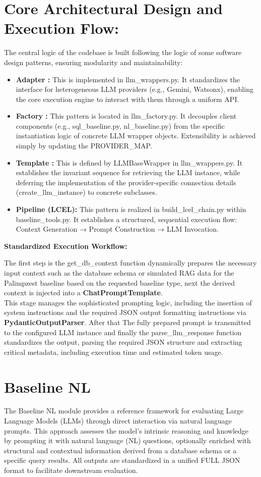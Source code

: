 \documentclass[12pt,a4paper]{article}
\begin{document}
\section{Core Architectural Design and Execution Flow:}
The central logic of the codebase is built following the logic of some software design patterns, ensuring modularity and maintainability:
\begin{itemize}
    \item \textbf{Adapter :} This is implemented in llm\_wrappers.py. It standardizes the interface for heterogeneous LLM providers (e.g., Gemini, Watsonx), enabling the core execution engine to interact with them through a uniform API.
    \item \textbf{Factory :}  This pattern is located in llm\_factory.py. It decouples client components (e.g., sql\_baseline.py, nl\_baseline.py) from the specific instantiation logic of concrete LLM wrapper objects. Extensibility is achieved simply by updating the PROVIDER\_MAP.
    \item \textbf{Template :} This is defined by LLMBaseWrapper in llm\_wrappers.py. It establishes the invariant sequence for retrieving the LLM instance, while deferring the implementation of the provider-specific connection details (create\_llm\_instance\(\)) to concrete subclasses.
    \item \textbf{Pipeline  (LCEL):} This pattern is realized in build\_lcel\_chain.py within baseline\_tools.py. It establishes a structured, sequential execution flow: Context Generation → Prompt Construction → LLM Invocation.
\end{itemize}

\textbf{Standardized Execution Workflow:}

The first step is the get\_db\_context function dynamically prepares the necessary input context such as the database schema or simulated RAG data for the Palimpzest baseline based on the requested baseline type, next the derived context is injected into a \textbf{ChatPromptTemplate}.
\\This stage manages the sophisticated prompting logic, including the insertion of system instructions and the required JSON output formatting instructions via \textbf{PydanticOutputParser}.
After that The fully prepared prompt is transmitted to the configured LLM instance and finally the parse\_llm\_response function standardizes the output, parsing the required JSON structure and extracting critical metadata, including execution time and estimated token usage.
\section{Baseline NL}
The Baseline NL module provides a reference framework for evaluating Large Language Models (LLMs) through direct interaction via natural language prompts.
This approach assesses the model’s intrinsic reasoning and knowledge by prompting it with natural language (NL) questions, optionally enriched with structural and contextual information derived from a database schema or a specific query results.
All outputs are standardized in a unified FULL JSON format to facilitate downstream evaluation.
\end{document}
